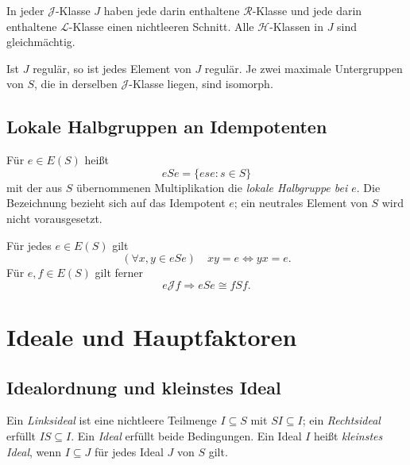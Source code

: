 \begin{theorem}
\label{b37guide:thm:regularity}
In jeder $\mathcal J$-Klasse $J$ haben jede darin enthaltene
$\mathcal R$-Klasse und jede darin enthaltene $\mathcal L$-Klasse
einen nichtleeren Schnitt. Alle $\mathcal H$-Klassen in $J$ sind gleichmächtig.

Ist $J$ regulär, so ist jedes Element von $J$ regulär.
Je zwei maximale Untergruppen von $S$,
die in derselben $\mathcal J$-Klasse liegen, sind isomorph.
\cite{pin,izhakian2011}
\end{theorem}

\section{Lokale Halbgruppen an Idempotenten}

\begin{definition}
Für $e\in E(S)$ heißt
\[
eSe=\{ese:s\in S\}
\]
mit der aus $S$ übernommenen Multiplikation die \emph{lokale Halbgruppe
bei $e$}. Die Bezeichnung bezieht sich auf das Idempotent $e$;
ein neutrales Element von $S$ wird nicht vorausgesetzt.
\end{definition}

\begin{theorem}
\label{b37guide:thm:local-monoids}
Für jedes $e\in E(S)$ gilt
\[
(\forall x,y\in eSe)\quad xy=e\iff yx=e.
\]
Für $e,f\in E(S)$ gilt ferner
\[
e\mathrel{\mathcal J}f\Longrightarrow eSe\cong fSf.
\]
\cite{izhakian2011,howie}
\end{theorem}

\chapter{Ideale und Hauptfaktoren}
\label{b37guide:chap:ideals}

\section{Idealordnung und kleinstes Ideal}

\begin{definition}
Ein \emph{Linksideal} ist eine nichtleere Teilmenge $I\subseteq S$ mit
$SI\subseteq I$; ein \emph{Rechtsideal} erfüllt $IS\subseteq I$.
Ein \emph{Ideal} erfüllt beide Bedingungen. Ein Ideal $I$ heißt
\emph{kleinstes Ideal}, wenn $I\subseteq J$ für jedes Ideal $J$ von $S$ gilt.
\end{definition}

